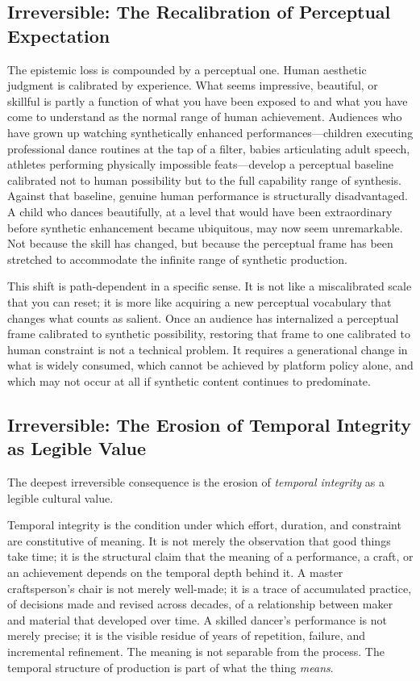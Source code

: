 \documentclass[12pt, a4paper]{article}
\begin{document}
\subsection{Irreversible: The Recalibration of Perceptual Expectation}

The epistemic loss is compounded by a perceptual one. Human aesthetic judgment is calibrated by experience. What seems impressive, beautiful, or skillful is partly a function of what you have been exposed to and what you have come to understand as the normal range of human achievement. Audiences who have grown up watching synthetically enhanced performances---children executing professional dance routines at the tap of a filter, babies articulating adult speech, athletes performing physically impossible feats---develop a perceptual baseline calibrated not to human possibility but to the full capability range of synthesis. Against that baseline, genuine human performance is structurally disadvantaged. A child who dances beautifully, at a level that would have been extraordinary before synthetic enhancement became ubiquitous, may now seem unremarkable. Not because the skill has changed, but because the perceptual frame has been stretched to accommodate the infinite range of synthetic production.

This shift is path-dependent in a specific sense. It is not like a miscalibrated scale that you can reset; it is more like acquiring a new perceptual vocabulary that changes what counts as salient. Once an audience has internalized a perceptual frame calibrated to synthetic possibility, restoring that frame to one calibrated to human constraint is not a technical problem. It requires a generational change in what is widely consumed, which cannot be achieved by platform policy alone, and which may not occur at all if synthetic content continues to predominate.

\subsection{Irreversible: The Erosion of Temporal Integrity as Legible Value}

The deepest irreversible consequence is the erosion of \textit{temporal integrity} as a legible cultural value.

Temporal integrity is the condition under which effort, duration, and constraint are constitutive of meaning. It is not merely the observation that good things take time; it is the structural claim that the meaning of a performance, a craft, or an achievement depends on the temporal depth behind it. A master craftsperson's chair is not merely well-made; it is a trace of accumulated practice, of decisions made and revised across decades, of a relationship between maker and material that developed over time. A skilled dancer's performance is not merely precise; it is the visible residue of years of repetition, failure, and incremental refinement. The meaning is not separable from the process. The temporal structure of production is part of what the thing \textit{means}.
\end{document}
